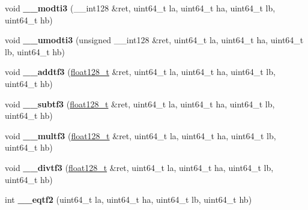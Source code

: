 \begin{DoxyCompactItemize}
\mbox{\label{classaacio_1_1chain_1_1compiler__builtins_acdd34c03426139518e058a8a6f2888e6}} 
void {\bfseries \+\_\+\+\_\+modti3} (\+\_\+\+\_\+int128 \&ret, uint64\+\_\+t la, uint64\+\_\+t ha, uint64\+\_\+t lb, uint64\+\_\+t hb)
\item 
\mbox{\label{classaacio_1_1chain_1_1compiler__builtins_a8cab491c0c525a0c1a712bdaa78f260e}} 
void {\bfseries \+\_\+\+\_\+umodti3} (unsigned \+\_\+\+\_\+int128 \&ret, uint64\+\_\+t la, uint64\+\_\+t ha, uint64\+\_\+t lb, uint64\+\_\+t hb)
\item 
\mbox{\label{classaacio_1_1chain_1_1compiler__builtins_a57e4969bf685d45b92be3bb07806369d}} 
void {\bfseries \+\_\+\+\_\+addtf3} (\mbox{\hyperlink{structfloat128__t}{float128\+\_\+t}} \&ret, uint64\+\_\+t la, uint64\+\_\+t ha, uint64\+\_\+t lb, uint64\+\_\+t hb)
\item 
\mbox{\label{classaacio_1_1chain_1_1compiler__builtins_a5b71a0ebad157384790faf0ce16fd238}} 
void {\bfseries \+\_\+\+\_\+subtf3} (\mbox{\hyperlink{structfloat128__t}{float128\+\_\+t}} \&ret, uint64\+\_\+t la, uint64\+\_\+t ha, uint64\+\_\+t lb, uint64\+\_\+t hb)
\item 
\mbox{\label{classaacio_1_1chain_1_1compiler__builtins_a11ebb7f94a43b04fbb1cefe92c816e53}} 
void {\bfseries \+\_\+\+\_\+multf3} (\mbox{\hyperlink{structfloat128__t}{float128\+\_\+t}} \&ret, uint64\+\_\+t la, uint64\+\_\+t ha, uint64\+\_\+t lb, uint64\+\_\+t hb)
\item 
\mbox{\label{classaacio_1_1chain_1_1compiler__builtins_a46dbb08ed0e201cd3ce695390bbb9f72}} 
void {\bfseries \+\_\+\+\_\+divtf3} (\mbox{\hyperlink{structfloat128__t}{float128\+\_\+t}} \&ret, uint64\+\_\+t la, uint64\+\_\+t ha, uint64\+\_\+t lb, uint64\+\_\+t hb)
\item 
\mbox{\label{classaacio_1_1chain_1_1compiler__builtins_acbe21ec4929d25576c4a9d226c75506c}} 
int {\bfseries \+\_\+\+\_\+eqtf2} (uint64\+\_\+t la, uint64\+\_\+t ha, uint64\+\_\+t lb, uint64\+\_\+t hb)

\end{DoxyCompactItemize}

